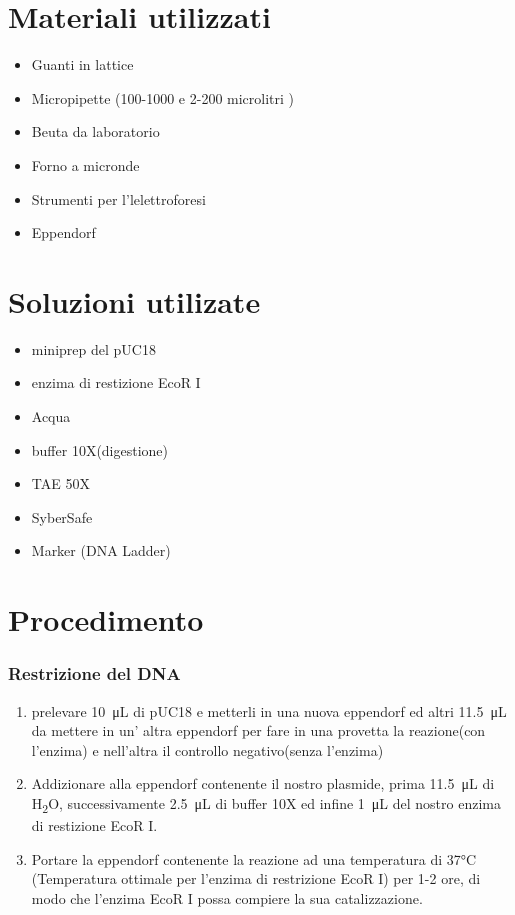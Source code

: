 \documentclass{article}
\begin{document}
\section{Materiali utilizzati}

\begin{itemize}
\item Guanti in lattice 
\item Micropipette (100-1000  e 2-200 microlitri  )
\item Beuta da laboratorio
\item Forno a micronde
\item Strumenti per l'lelettroforesi
\item Eppendorf
\end{itemize}


\section{Soluzioni utilizate}

\begin{itemize}

\item miniprep del pUC18
\item enzima di restizione EcoR I
\item Acqua
\item buffer 10X(digestione)
\item TAE 50X
\item SyberSafe
\item Marker (DNA Ladder)

\end{itemize}

\section{Procedimento}

\subsubsection{Restrizione del DNA}

\begin{enumerate}

\item prelevare  \SI{10}{\micro\liter} di pUC18 e metterli in una nuova eppendorf ed altri  \SI{11.5}{\micro\liter} da mettere in un' altra eppendorf per fare in una provetta la reazione(con l'enzima) e nell'altra il controllo negativo(senza l'enzima) 

\item Addizionare alla eppendorf contenente il nostro plasmide, prima \SI{11.5}{\micro\liter} di H\textsubscript{2}O, successivamente  \SI{2.5}{\micro\liter} di buffer 10X ed infine  \SI{1}{\micro\liter} del nostro enzima di restizione EcoR I.

\item Portare la eppendorf contenente la reazione ad una temperatura di 37°C (Temperatura ottimale per l'enzima di restrizione EcoR I) per 1-2 ore, di modo che l'enzima EcoR I possa compiere la sua catalizzazione.

\end{enumerate}
\end{document}
